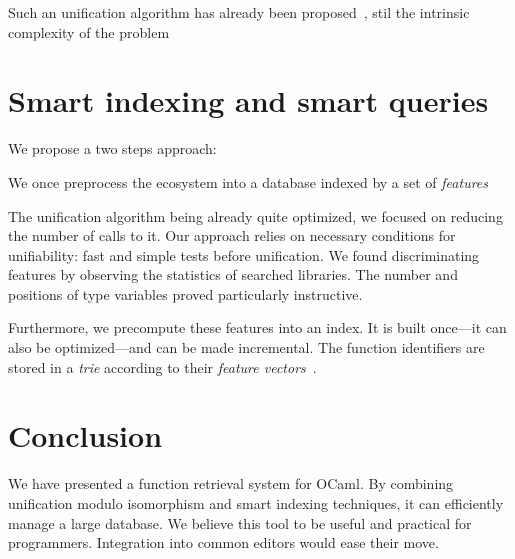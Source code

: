 \documentclass [a4paper,11pt]{scrartcl}
\begin{document}
Such an unification algorithm has already been proposed~\cite {boudet}, stil the intrinsic complexity of the problem 




\section{Smart indexing and smart queries}


We propose a two steps approach:
\begin{compactitem}
  \item We once preprocess the ecosystem into a database indexed by a set of \emph{features} 
\end{compactitem}

The unification algorithm being already quite optimized, we focused on reducing the number of calls to it. Our approach relies on necessary conditions for unifiability: fast and simple tests before unification. We found discriminating features by observing the statistics of searched libraries. The number and positions of type variables proved particularly instructive.

Furthermore, we precompute these features into an index. It is built once—it can also be optimized—and can be made incremental. The function identifiers are stored in a \textit{trie} according to their \textit{feature vectors}~\cite{schulz}.



\section{Conclusion}

We have presented a function retrieval system for OCaml. By combining unification modulo isomorphism and smart indexing techniques, it can efficiently manage a large database. We believe this tool to be useful and practical for programmers. Integration into common editors would ease their move.


\printbibliography
\end{document}

